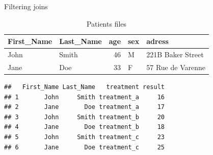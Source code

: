 \documentclass[14pt,ignorenonframetext,]{bredelebeamer}
\newenvironment{Shaded}{\begin{snugshade}}{\end{snugshade}}
\newcommand{\KeywordTok}[1]{\textcolor[rgb]{0.94,0.87,0.69}{#1}}
\newcommand{\DataTypeTok}[1]{\textcolor[rgb]{0.87,0.87,0.75}{#1}}
\newcommand{\DecValTok}[1]{\textcolor[rgb]{0.86,0.86,0.80}{#1}}
\newcommand{\StringTok}[1]{\textcolor[rgb]{0.80,0.58,0.58}{#1}}
\newcommand{\OperatorTok}[1]{\textcolor[rgb]{0.94,0.94,0.82}{#1}}
\newcommand{\NormalTok}[1]{\textcolor[rgb]{0.80,0.80,0.80}{#1}}
\begin{document}
\begin{frame}[fragile]{Filtering joins}

\begin{table}[t]

\caption{\label{tab:unnamed-chunk-53}Patients files}
\centering
\begin{tabular}{l|l|r|l|l}
\hline
First\_Name & Last\_Name & age & sex & adress\\
\hline
John & Smith & 46 & M & 221B Baker Street\\
\hline
Jane & Doe & 33 & F & 57 Rue de Varenne\\
\hline
\end{tabular}
\end{table}

\begin{Shaded}
\end{Shaded}

\begin{verbatim}
##   First_Name Last_Name   treatment result
## 1       John     Smith treatment_a     16
## 2       Jane       Doe treatment_a     17
## 3       John     Smith treatment_b     20
## 4       Jane       Doe treatment_b     18
## 5       John     Smith treatment_c     23
## 6       Jane       Doe treatment_c     25
\end{verbatim}

\end{frame}
\end{document}
